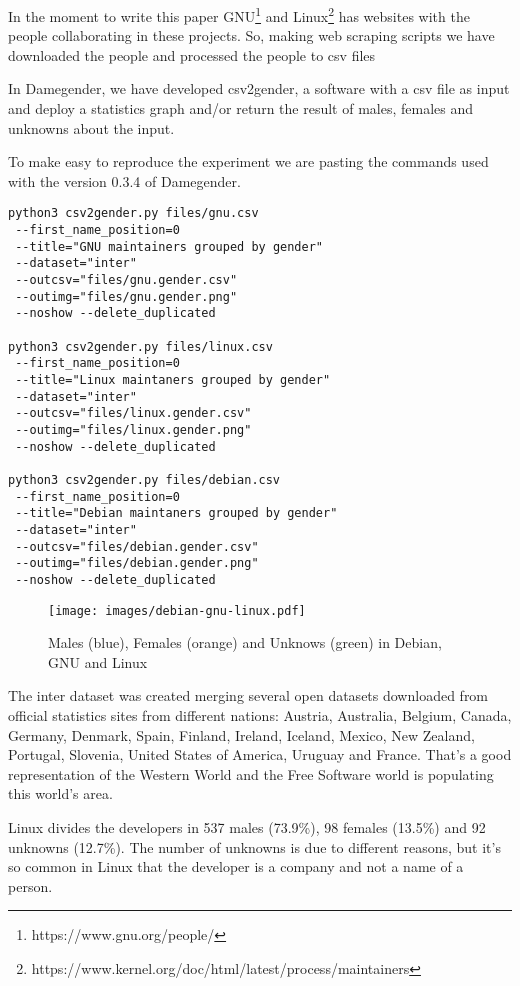 \documentclass[a4paper]{article}
\begin{document}
In the moment to write this paper
GNU\footnote{https://www.gnu.org/people/} and
Linux\footnote{https://www.kernel.org/doc/html/latest/process/maintainers}
has websites with the people collaborating in these projects. So,
making web scraping scripts we have downloaded the people and processed
the people to csv files

In Damegender, we have developed csv2gender, a software with a csv
file as input and deploy a statistics graph and/or return the result
of males, females and unknowns about the input.

To make easy to reproduce the experiment we are pasting the commands
used with the version 0.3.4 of Damegender.

\begin{verbatim}
python3 csv2gender.py files/gnu.csv
 --first_name_position=0
 --title="GNU maintainers grouped by gender"
 --dataset="inter"
 --outcsv="files/gnu.gender.csv"
 --outimg="files/gnu.gender.png"
 --noshow --delete_duplicated

python3 csv2gender.py files/linux.csv
 --first_name_position=0
 --title="Linux maintaners grouped by gender"
 --dataset="inter"
 --outcsv="files/linux.gender.csv"
 --outimg="files/linux.gender.png"
 --noshow --delete_duplicated

python3 csv2gender.py files/debian.csv
 --first_name_position=0
 --title="Debian maintaners grouped by gender"
 --dataset="inter"
 --outcsv="files/debian.gender.csv"
 --outimg="files/debian.gender.png"
 --noshow --delete_duplicated
\end{verbatim}

\begin{figure}
  \centering
  \texttt{[image: images/debian-gnu-linux.pdf]}
  \caption[Caption for LOF]{Males (blue), Females (orange) and Unknows (green) in Debian, GNU and Linux}
\end{figure}

The inter dataset was created merging several open datasets downloaded
from official statistics sites from different nations: Austria,
Australia, Belgium, Canada, Germany, Denmark, Spain, Finland, Ireland,
Iceland, Mexico, New Zealand, Portugal, Slovenia, United States of
America, Uruguay and France. That's a good representation of the
Western World and the Free Software world is populating this world's
area\cite{gonzalez2008geographic}.

Linux divides the developers in 537 males (73.9\%), 98 females
(13.5\%) and 92 unknowns (12.7\%). The number of unknowns is due to
different reasons, but it's so common in Linux that the developer is a
company and not a name of a person.
\end{document}
